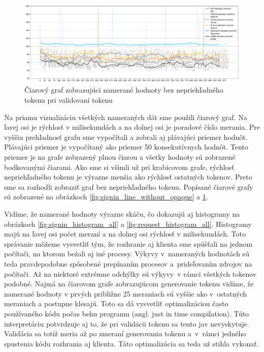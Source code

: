 \begin{figure}[H]
  \centerline{\includegraphics[width=1\textwidth]{images/request_line_without_opaque}}
  \caption[Čiarový graf -- validácia, hodnoty bez nepriehľadného tokenu]{Čiarový graf zobrazujúci namerané hodnoty bez nepriehľadného tokenu pri validovaní tokenu}
  \label{fig:request_line_without_opaque}
\end{figure}

Na priamu vizualizáciu všetkých nameraných dát sme použili čiarový graf. Na ľavej osi je rýchlosť v milisekundách a na dolnej osi je poradové číslo merania. Pre vyššiu prehľadnosť grafu sme vypočítali a zobrali aj plávajúci priemer hodnôt. Plávajúci priemer je vypočítaný ako priemer 50 konsekutívnych hodnôt. Tento priemer je na grafe zobrazený plnou čiarou a všetky hodnoty sú zobrazené bodkovanými čiarami. Ako sme si všimli už pri krabicovom grafe, rýchlosť nepriehľadného tokenu je výrazne menšia ako rýchlosť ostatných tokenov. Preto sme sa rozhodli zobraziť graf bez nepriehľadného tokenu. Popísané čiarové grafy sú zobrazené na obrázkoch \ref{fig:signin_line_without_opaque} a \ref{fig:request_line_without_opaque}.


Vidíme, že namerané hodnoty výrazne skáču, čo dokazujú aj histogramy na obrázkoch \ref{fig:signin_histogram_all} a \ref{fig:request_histogram_all}. Histogramy majú na ľavej osi počet meraní a na dolnej osi rýchlosť v milisekundách. Toto správanie môžeme vysvetliť tým, že rozhranie aj klienta sme spúšťali na jednom počítači, na ktorom bežali aj iné procesy. Výkyvy v~nameraných hodnotách sú teda pravdepodobne spôsobené prepínaním procesov a~prideľovaním zdrojov na počítači. Až na niektoré extrémne odchýlky sú výkyvy~v rámci všetkých tokenov podobné. Najmä na čiarovom grafe zobrazujúcom generovanie tokenu vidíme, že namerané hodnoty v prvých približne 25 meraniach sú vyššie ako v~ostatných meraniach a postupne klesajú. Toto sa dá vysvetliť optimalizáciou často používaného kódu počas behu programu (angl. just in time compilation). Túto interpretáciu potvrdzuje aj to, že pri validácii tokenu sa tento jav nevyskytuje. Validácia sa totiž meria až po zmeraní generovania tokenu a~v~rámci jedného spustenia kódu rozhrania aj klienta. Táto optimalizácia sa teda už stihla vykonať.


